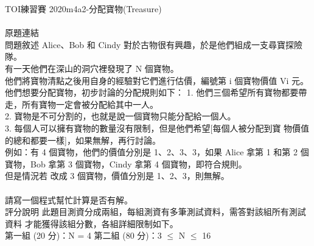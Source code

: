 TOI練習賽 2020m4a2-分配寶物(Treasure)\\
 \\
 原題連結\\
問題敘述 Alice、Bob 和 Cindy 對於古物很有興趣，於是他們組成一支尋寶探險隊。\\
有一天他們在深山的洞穴裡發現了 N 個寶物。\\
他們將寶物清點之後用自身的經驗對它們進行估價，編號第 i 個寶物價值 Vi 元。\\
他們想要分配寶物，初步討論的分配規則如下：  1. 他們三個希望所有寶物都要帶走，所有寶物一定會被分配給其中一人。\\
  2. 寶物是不可分割的，也就是說一個寶物只能分配給一個人。\\
  3. 每個人可以擁有寶物的數量沒有限制，但是他們希望[每個人被分配到寶 物價值的總和都要一樣]，如果無解，再行討論。\\
   例如：有 4 個寶物，他們的價值分別是 1、2、3、3，如果 Alice 拿第 1 和第 2 個寶物，Bob 拿第 3 個寶物，Cindy 拿第 4 個寶物，即符合規則。\\
但是情況若 改成 3 個寶物，價值分別是 1、2、3，則無解。\\
\\
請寫一個程式幫忙計算是否有解。\\
  評分說明 此題目測資分成兩組，每組測資有多筆測試資料，需答對該組所有測試資料 才能獲得該組分數，各組詳細限制如下。\\
  第一組 (20 分)：N = 4 第二組 (80 分)：3 $\leq$ N $\leq$ 16
